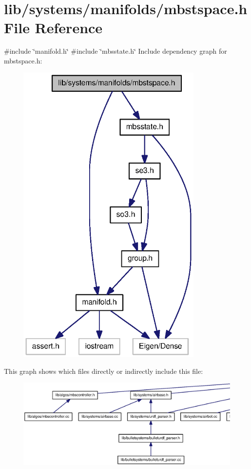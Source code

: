 \section{lib/systems/manifolds/mbstspace.h \-File \-Reference}
\label{mbstspace_8h}
{\ttfamily \#include \char`\"{}manifold.\-h\char`\"{}}\*
{\ttfamily \#include \char`\"{}mbsstate.\-h\char`\"{}}\*
\-Include dependency graph for mbstspace.\-h\-:\nopagebreak
\begin{figure}[H]
\begin{center}
\leavevmode
\includegraphics[width=262pt]{mbstspace_8h__incl}
\end{center}
\end{figure}
\-This graph shows which files directly or indirectly include this file\-:
\nopagebreak
\begin{figure}[H]
\begin{center}
\leavevmode
\includegraphics[width=350pt]{mbstspace_8h__dep__incl}
\end{center}
\end{figure}
